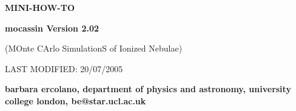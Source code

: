 \documentclass[11pt]{article}
\begin{document}
\centerline
{\Large \bf MINI-HOW-TO }

\vspace{4cm}

\centerline
{\Large \bf {\sc \Huge mocassin} Version 2.02 }

\vspace{2cm}

\centerline
{\Large (MOnte CArlo SimulationS of Ionized Nebulae) }


\vspace{3cm}

\centerline
{LAST MODIFIED: 20/07/2005}



\vspace{10cm}



\centerline
{\bf barbara ercolano, department of physics and astronomy, university college london, be@star.ucl.ac.uk} 

\vspace{10cm}


\vspace{0.7cm}

\pagebreak
\end{document}
